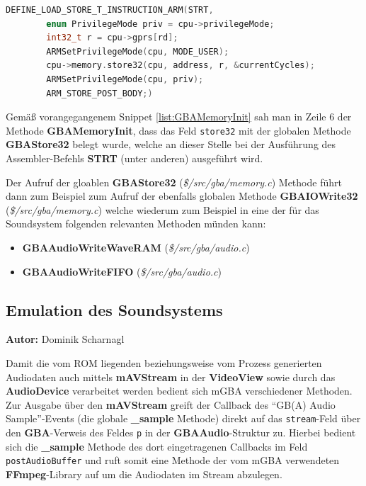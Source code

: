 \documentclass[11pt,a4paper]{scrartcl}
\newcommand{\AutorDominik} {
    \vspace{-4mm}
    \large \textbf{Autor:} Dominik Scharnagl \normalsize
    \vspace{2mm}
}
\begin{document}
\vspace{5mm}
\begin{lstlisting}[language=C++, caption={ARM Instruction Makro f\"ur \textbf{STRT}}, label={list:ARMInstruction_STRT}]
    DEFINE_LOAD_STORE_T_INSTRUCTION_ARM(STRT,
	    enum PrivilegeMode priv = cpu->privilegeMode;
	    int32_t r = cpu->gprs[rd];
	    ARMSetPrivilegeMode(cpu, MODE_USER);
	    cpu->memory.store32(cpu, address, r, &currentCycles);
	    ARMSetPrivilegeMode(cpu, priv);
	    ARM_STORE_POST_BODY;)
\end{lstlisting}

Gem\"a{\ss} vorangegangenem Snippet \ref{list:GBAMemoryInit} sah man in Zeile 6 der Methode \textbf{GBAMemoryInit}, dass das Feld \verb|store32| mit der globalen Methode \textbf{GBAStore32} belegt wurde, welche an dieser Stelle bei der Ausf\"uhrung des Assembler-Befehls \textbf{STRT} (unter anderen) ausgef\"uhrt wird.

Der Aufruf der gloablen \textbf{GBAStore32} (\textit{\$/src/gba/memory.c}) Methode f\"uhrt dann zum Beispiel zum Aufruf der ebenfalls globalen Methode \textbf{GBAIOWrite32} (\textit{\$/src/gba/memory.c}) welche wiederum zum Beispiel in eine der f\"ur das Soundsystem folgenden relevanten Methoden m\"unden kann:

\begin{itemize}
    \item \textbf{GBAAudioWriteWaveRAM} (\textit{\$/src/gba/audio.c})
    \item \textbf{GBAAudioWriteFIFO} (\textit{\$/src/gba/audio.c})
\end{itemize}



\subsection{Emulation des Soundsystems} \label{EmulationSoundsystem}
\AutorDominik

Damit die vom ROM liegenden beziehungsweise vom Prozess generierten Audiodaten auch mittels \textbf{mAVStream} in der \textbf{VideoView} sowie durch das \textbf{AudioDevice} verarbeitet werden bedient sich mGBA verschiedener Methoden. Zur Ausgabe \"uber den \textbf{mAVStream} greift der Callback des \enquote{GB(A) Audio Sample}-Events (die globale \textbf{{\_}sample} Methode) direkt auf das \verb|stream|-Feld \"uber den \textbf{GBA}-Verweis des Feldes \verb|p| in der \textbf{GBAAudio}-Struktur zu. Hierbei bedient sich die \textbf{{\_}sample} Methode des dort eingetragenen Callbacks im Feld \verb|postAudioBuffer| und ruft somit eine Methode der vom mGBA verwendeten \textbf{FFmpeg}-Library auf um die Audiodaten im Stream abzulegen.
\end{document}
